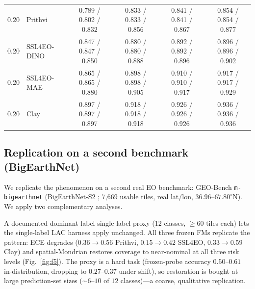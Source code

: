 \documentclass[journal]{IEEEtran}
\renewcommand{\_}{\textunderscore\allowbreak}
\begin{document}
\begin{table}[!t]
\begin{tabular}{clcccc}
\midrule
0.20 & Prithvi & 0.789 / 0.802 / 0.832\rlap{$^{\dagger}$} & 0.833 / 0.833 / 0.856\rlap{$^{\dagger}$} & 0.841 / 0.841 / 0.867\rlap{$^{\dagger}$} & 0.854 / 0.854 / 0.877\rlap{$^{\dagger}$} \\
0.20 & SSL4EO-DINO & 0.847 / 0.847 / 0.850\rlap{$^{\dagger}$} & 0.880 / 0.880 / 0.888\rlap{$^{\dagger}$} & 0.892 / 0.892 / 0.896\rlap{$^{\dagger}$} & 0.896 / 0.896 / 0.902\rlap{$^{\dagger}$} \\
0.20 & SSL4EO-MAE & 0.865 / 0.865 / 0.880\rlap{$^{\dagger}$} & 0.898 / 0.898 / 0.905\rlap{$^{\dagger}$} & 0.910 / 0.910 / 0.917\rlap{$^{\dagger}$} & 0.917 / 0.917 / 0.929\rlap{$^{\dagger}$} \\
0.20 & Clay & 0.897 / 0.897 / 0.897\rlap{$^{\dagger}$} & 0.918 / 0.918 / 0.918\rlap{$^{\dagger}$} & 0.926 / 0.926 / 0.926\rlap{$^{\dagger}$} & 0.936 / 0.936 / 0.936\rlap{$^{\dagger}$} \\
\bottomrule
\end{tabular}
\end{table}

\subsection{Replication on a second benchmark (BigEarthNet)}
We replicate the phenomenon on a second real EO benchmark: GEO-Bench \citep{lacoste2023geobench} \texttt{m-bigearthnet}
(BigEarthNet-S2 \citep{sumbul2019bigearthnet}; 7{,}669 usable tiles, real lat/lon, $36.96$--$67.80^\circ$N). We apply two complementary
analyses.

A documented dominant-label single-label proxy (12 classes, $\ge60$ tiles each)
lets the single-label LAC harness apply unchanged. All three frozen FMs replicate the pattern: ECE degrades
($0.36\to0.56$ Prithvi, $0.15\to0.42$ SSL4EO, $0.33\to0.59$ Clay) and spatial-Mondrian restores coverage
to near-nominal at all three risk levels (Fig.~\ref{fig:f5}). The proxy is a hard task (frozen-probe accuracy $0.50$--$0.61$
in-distribution, dropping to $0.27$--$0.37$ under shift), so restoration is bought at large prediction-set
sizes (${\sim}6$--$10$ of $12$ classes)---a coarse, qualitative replication.
\end{document}

